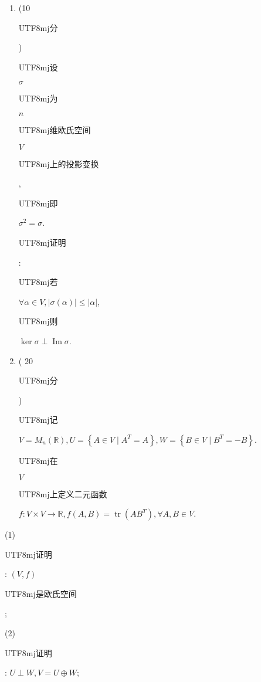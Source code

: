 \documentclass[10pt]{article}
\begin{document}
\begin{enumerate}
  \item (10 \begin{CJK}{UTF8}{mj}分\end{CJK}) \begin{CJK}{UTF8}{mj}设\end{CJK} $\sigma$ \begin{CJK}{UTF8}{mj}为\end{CJK} $n$ \begin{CJK}{UTF8}{mj}维欧氏空间\end{CJK} $V$ \begin{CJK}{UTF8}{mj}上的投影变换\end{CJK}, \begin{CJK}{UTF8}{mj}即\end{CJK} $\sigma^{2}=\sigma$. \begin{CJK}{UTF8}{mj}证明\end{CJK}: \begin{CJK}{UTF8}{mj}若\end{CJK} $\forall \alpha \in V,|\sigma(\alpha)| \leq|\alpha|$, \begin{CJK}{UTF8}{mj}则\end{CJK} $\operatorname{ker} \sigma \perp \operatorname{Im} \sigma$.

  \item ( 20 \begin{CJK}{UTF8}{mj}分\end{CJK}) \begin{CJK}{UTF8}{mj}记\end{CJK} $V=M_{n}(\mathbb{R}), U=\left\{A \in V \mid A^{T}=A\right\}, W=\left\{B \in V \mid B^{T}=-B\right\}$. \begin{CJK}{UTF8}{mj}在\end{CJK} $V$ \begin{CJK}{UTF8}{mj}上定义二元函数\end{CJK} $f: V \times V \rightarrow \mathbb{R}, f(A, B)=\operatorname{tr}\left(A B^{T}\right), \forall A, B \in V .$

\end{enumerate}
(1) \begin{CJK}{UTF8}{mj}证明\end{CJK}: $(V, f)$ \begin{CJK}{UTF8}{mj}是欧氏空间\end{CJK};

(2) \begin{CJK}{UTF8}{mj}证明\end{CJK}: $U \perp W, V=U \oplus W$;
\end{document}
